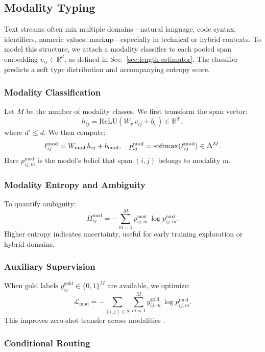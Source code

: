 \subsection{Modality Typing}
\label{sec:modality-typing}

Text streams often mix multiple domains—natural language, code syntax, identifiers, numeric values, markup—especially in technical or hybrid contexts. To model this structure, we attach a modality classifier to each pooled span embedding \(v_{ij}\in\mathbb{R}^d\), as defined in Sec.~\ref{sec:length-estimator}. The classifier predicts a soft type distribution and accompanying entropy score.

\subsubsection{Modality Classification}

Let \(M\) be the number of modality classes. We first transform the span vector:
\[
h_{ij} = \mathrm{ReLU}(W_v\,v_{ij} + b_v)\in\mathbb{R}^{d'},
\]
where \(d'\le d\). We then compute:
\[
\ell^{\mathrm{mod}}_{ij} = W_{\mathrm{mod}}\,h_{ij} + b_{\mathrm{mod}},
\quad
p^{\mathrm{mod}}_{ij} = \mathrm{softmax}(\ell^{\mathrm{mod}}_{ij}) \in \Delta^M.
\]
Here \(p^{\mathrm{mod}}_{ij,m}\) is the model’s belief that span \((i,j)\) belongs to modality \(m\).

\subsubsection{Modality Entropy and Ambiguity}

To quantify ambiguity:
\[
H^{\mathrm{mod}}_{ij}
= -\sum_{m=1}^M
p^{\mathrm{mod}}_{ij,m}\,\log p^{\mathrm{mod}}_{ij,m}.
\]
Higher entropy indicates uncertainty, useful for early training exploration or hybrid domains.

\subsubsection{Auxiliary Supervision}

When gold labels \(y^{\mathrm{gold}}_{ij}\in\{0,1\}^M\) are available, we optimize:
\[
\mathcal{L}_{\mathrm{mod}}
= -\sum_{(i,j)\in S}
\sum_{m=1}^M
y^{\mathrm{gold}}_{ij,m}\,\log p^{\mathrm{mod}}_{ij,m}.
\]
This improves zero-shot transfer across modalities \cite{khashabi2020unifiedqa,gupta2022molt}.

\subsubsection{Conditional Routing}


